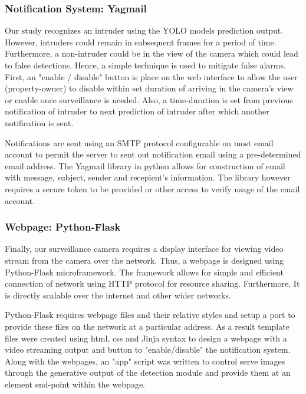 \documentclass[../../main.tex]{subfiles}
\begin{document}
                \subsubsection{Notification System: Yagmail}
                    Our study recognizes an intruder using the YOLO models prediction output. However, intruders could remain in subsequent frames for a period of time. Furthermore, a non-intruder could be in the view of the camera which could lead to false detections. Hence, a simple technique is used to mitigate false alarms. First, an "enable / disable" button is place on the web interface to allow the user (property-owner) to disable within set duration of arriving in the camera's view or enable once surveillance is needed. Also, a time-duration is set from previous notification of intruder to next prediction of intruder after which another notification is sent.

                    Notifications are sent using an SMTP protocol configurable on most email account to permit the server to sent out notification email using a pre-determined email address. The Yagmail library in python allows for construction of email with message, subject, sender and recepient's information. The library however requires a secure token to be provided or other access to verify usage of the email account.

                \subsubsection{Webpage: Python-Flask}
                    Finally, our surveillance camera requires a display interface for viewing video stream from the camera over the network. Thus, a webpage is designed using Python-Flask microframework. The framework allows for simple and efficient connection of network using HTTP protocol for resource sharing. Furthermore, It is directly scalable over the internet and other wider networks.

                    Python-Flask requires webpage files and their relative styles and setup a port to provide these files on the network at a particular address. As a result template files were created using html, css and Jinja syntax to design a webpage with a video streaming output and button to "enable/disable" the notification system. Along with the webpages, an "app" script was written to control serve images through the generative output of the detection module and provide them at an element end-point within the webpage.
\end{document}
